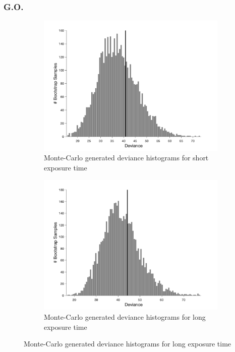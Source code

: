 \documentclass{article}
\begin{document}
\subsubsection*{G.O.}
\begin{figure}[!hb]
    \begin{subfigure}{0.494\textwidth}
        \centering
        \includegraphics[width = \linewidth]{Thesis/plots/gof/segDist/segDist_go_short_bootstrap.png}
        \caption{Monte-Carlo generated deviance histograms for short exposure time}
        \label{fig:da_gof_short_bootstrap}
    \end{subfigure}
    \hspace{0.01\textwidth}
    \begin{subfigure}{0.494\textwidth}
        \centering
        \includegraphics[width = \linewidth]{Thesis/plots/gof/segDist/segDist_go_long_bootstrap.png}
        \caption{Monte-Carlo generated deviance histograms for long exposure time}
        \label{fig:da_gof_long_bootstrap}
    \end{subfigure}
    

\end{figure}
\end{document}
